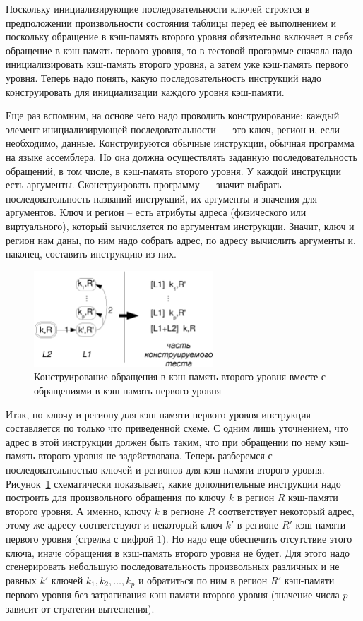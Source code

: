 \begin{enumerate}
Поскольку инициализирующие последовательности ключей строятся в предположении
произвольности состояния таблицы перед её выполнением и поскольку обращение в
кэш-память второго уровня обязательно включает в себя обращение в кэш-память
первого уровня, то в тестовой прогармме сначала надо инициализировать кэш-память
второго уровня, а затем уже кэш-память первого уровня. Теперь надо понять, какую
последовательность инструкций надо конструировать для инициализации каждого
уровня кэш-памяти.

Еще раз вспомним, на основе чего надо проводить конструирование: каждый элемент
инициализирующей последовательности --- это ключ, регион и, если необходимо, данные.
Конструируются обычные инструкции, обычная программа на языке ассемблера. Но она
должна осуществлять заданную последовательность обращений, в том числе, в
кэш-память второго уровня. У каждой инструкции есть аргументы. Сконструировать
программу --- значит выбрать последовательность названий инструкций, их аргументы и значения
для аргументов. Ключ и регион -- есть атрибуты адреса (физического или
виртуального), который вычисляется по аргументам инструкции. Значит, ключ и
регион нам даны, по ним надо собрать адрес, по адресу вычислить аргументы и,
наконец, составить инструкцию из них.

\begin{figure}[h] \centering
\includegraphics[width=0.6\textwidth]{2.theor/L1L2}
\caption{Конструирование обращения в кэш-память второго уровня вместе с
обращениями в кэш-память первого уровня}\label{fig:L1L2}
\end{figure}

Итак, по ключу и региону для кэш-памяти первого уровня
инструкция составляется по только что приведенной схеме. С одним лишь
уточнением, что адрес в этой инструкции должен быть таким, что при обращении по нему кэш-память
второго уровня не задействована. Теперь разберемся с последовательностью ключей
и регионов для кэш-памяти второго уровня. Рисунок~\ref{fig:L1L2} схематически
показывает, какие дополнительные инструкции надо построить для произвольного
обращения по ключу $k$ в регион $R$ кэш-памяти второго уровня. А именно, ключу
$k$ в регионе $R$ соответствует некоторый адрес, этому же адресу соответствуют и
некоторый ключ $k'$ в регионе $R'$ кэш-памяти первого уровня (стрелка с цифрой
1). Но надо еще обеспечить отсутствие этого ключа, иначе обращения в кэш-память
второго уровня не будет. Для этого надо сгенерировать небольшую
последовательность произвольных различных и не равных $k'$ ключей $k_1, k_2,
\dots, k_p$ и обратиться по ним в регион $R'$ кэш-памяти первого уровня без
затрагивания кэш-памяти второго уровня (значение числа $p$ зависит от стратегии
вытеснения).


\end{enumerate}
